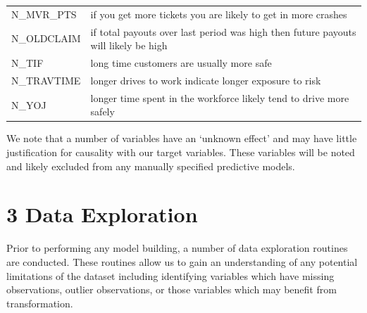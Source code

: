 \documentclass[]{article}
\begin{document}
\begin{longtable}[]{@{}ll@{}}
\begin{minipage}[t]{0.18\columnwidth}
N\_MVR\_PTS
\strut\end{minipage} &
\begin{minipage}[t]{0.76\columnwidth}\raggedright\strut
if you get more tickets you are likely to get in more crashes
\strut\end{minipage}\tabularnewline
\begin{minipage}[t]{0.18\columnwidth}\raggedright\strut
N\_OLDCLAIM
\strut\end{minipage} &
\begin{minipage}[t]{0.76\columnwidth}\raggedright\strut
if total payouts over last period was high then future payouts will
likely be high
\strut\end{minipage}\tabularnewline
\begin{minipage}[t]{0.18\columnwidth}\raggedright\strut
N\_TIF
\strut\end{minipage} &
\begin{minipage}[t]{0.76\columnwidth}\raggedright\strut
long time customers are usually more safe
\strut\end{minipage}\tabularnewline
\begin{minipage}[t]{0.18\columnwidth}\raggedright\strut
N\_TRAVTIME
\strut\end{minipage} &
\begin{minipage}[t]{0.76\columnwidth}\raggedright\strut
longer drives to work indicate longer exposure to risk
\strut\end{minipage}\tabularnewline
\begin{minipage}[t]{0.18\columnwidth}\raggedright\strut
N\_YOJ
\strut\end{minipage} &
\begin{minipage}[t]{0.76\columnwidth}\raggedright\strut
longer time spent in the workforce likely tend to drive more safely
\strut\end{minipage}\tabularnewline
\bottomrule
\end{longtable}

We note that a number of variables have an `unknown effect' and may have
little justification for causality with our target variables. These
variables will be noted and likely excluded from any manually specified
predictive models.

\section{3 Data Exploration}\label{data-exploration}

Prior to performing any model building, a number of data exploration
routines are conducted. These routines allow us to gain an understanding
of any potential limitations of the dataset including identifying
variables which have missing observations, outlier observations, or
those variables which may benefit from transformation.
\end{document}
